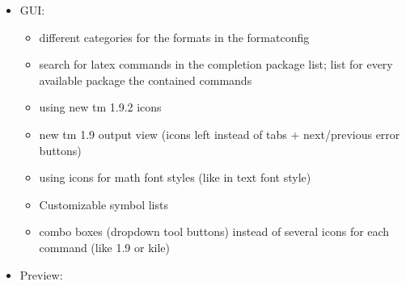 \documentclass[10pt,a4paper,landscape]{report}
\begin{document}
\begin{itemize}
	\item GUI: \begin{itemize}
		\item different categories for the formats in the formatconfig
		\item search for latex commands in the completion package list; list for every available package the contained commands
		\item using new tm 1.9.2 icons
		\item new tm 1.9 output view (icons left instead of tabs + next/previous error buttons)
		\item using icons for math font styles (like in text font style)
		\item Customizable symbol lists
		\item combo boxes (dropdown tool buttons) instead of several icons for each command (like 1.9 or kile)
	\end{itemize}
	\item Preview: \begin{itemize}
	

\end{itemize}
\end{itemize}
\end{document}
